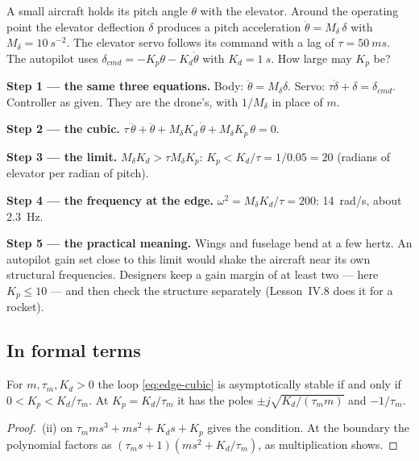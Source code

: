 \begin{example}
\label{ex:edge-aircraft}
A small aircraft holds its pitch angle $\theta$ with the elevator. Around the operating point the elevator deflection $\delta$ produces a pitch acceleration $\ddot\theta = M_\delta\,\delta$ with $M_\delta = \SI{10}{s^{-2}}$. The elevator servo follows its command with a lag of $\tau = \SI{50}{ms}$. The autopilot uses $\delta_{cmd} = -K_p\theta - K_d\dot\theta$ with $K_d = \SI{1}{s}$. How large may $K_p$ be?

\textbf{Step 1 — the same three equations.} Body: $\ddot\theta = M_\delta\delta$. Servo: $\tau\dot\delta + \delta = \delta_{cmd}$. Controller as given. They are the drone's, with $1/M_\delta$ in place of $m$.

\textbf{Step 2 — the cubic.} $\tau\,\dddot\theta + \ddot\theta + M_\delta K_d\,\dot\theta + M_\delta K_p\,\theta = 0$.

\textbf{Step 3 — the limit.} $M_\delta K_d > \tau M_\delta K_p$: $K_p < K_d/\tau = 1/0.05 = 20$ (radians of elevator per radian of pitch).

\textbf{Step 4 — the frequency at the edge.} $\omega^2 = M_\delta K_d/\tau = 200$: \SI{14}{rad/s}, about \SI{2.3}{Hz}.

\textbf{Step 5 — the practical meaning.} Wings and fuselage bend at a few hertz. An autopilot gain set close to this limit would shake the aircraft near its own structural frequencies. Designers keep a gain margin of at least two — here $K_p \le 10$ — and then check the structure separately (Lesson~IV.8 does it for a rocket).
\end{example}

\subsection{In formal terms}

\begin{theorem}
\label{thm:edge-limit}
For $m, \tau_m, K_d > 0$ the loop \eqref{eq:edge-cubic} is asymptotically stable if and only if $0 < K_p < K_d/\tau_m$. At $K_p = K_d/\tau_m$ it has the poles $\pm j\sqrt{K_d/(\tau_m m)}$ and $-1/\tau_m$.
\end{theorem}
\begin{proof}
\,(ii) on $\tau_m m s^3 + m s^2 + K_d s + K_p$ gives the condition. At the boundary the polynomial factors as $(\tau_m s + 1)(m s^2 + K_d/\tau_m)$, as multiplication shows.
\end{proof}

